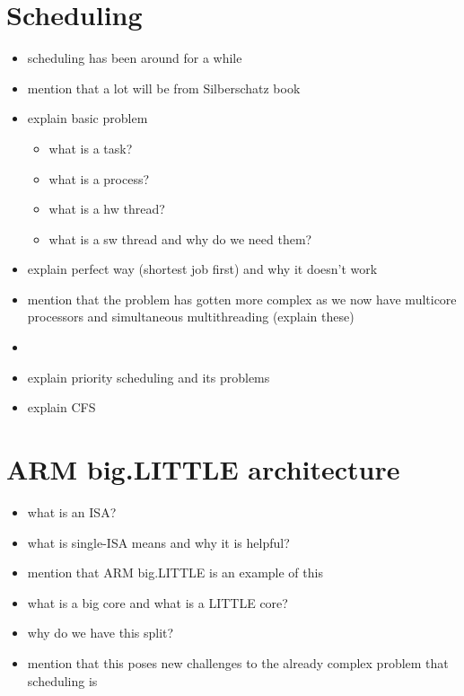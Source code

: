 \section{Scheduling}
\begin{itemize}
    \item scheduling has been around for a while
    \item mention that a lot will be from Silberschatz book
    \item explain basic problem
    \begin{itemize}
        \item what is a task?
        \item what is a process?
        \item what is a hw thread?
        \item what is a sw thread and why do we need them?
    \end{itemize}
    \item explain perfect way (shortest job first) and why it doesn't work
    \item mention that the problem has gotten more complex as we now have
          multicore processors and simultaneous multithreading (explain these)
    \item 
    \item explain priority scheduling and its problems
    \item explain CFS
\end{itemize}

\section{ARM big.LITTLE architecture}
\begin{itemize}
    \item what is an ISA?
    \item what is single-ISA means and why it is helpful?
    \item mention that ARM big.LITTLE is an example of this
    \item what is a big core and what is a LITTLE core?
    \item why do we have this split?
    \item mention that this poses new challenges to the already complex problem
          that scheduling is
\end{itemize}
